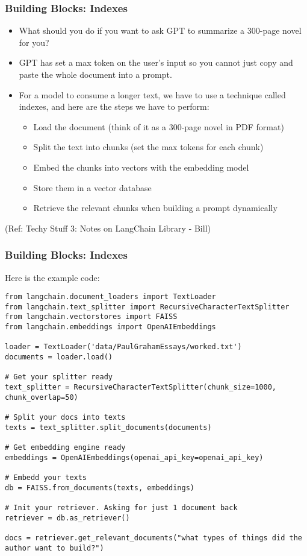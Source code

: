 \begin{frame}[fragile]\frametitle{Building Blocks: Indexes}

\begin{itemize}
\item What should you do if you want to ask GPT to summarize a 300-page novel for you? 
\item GPT has set a max token on the user’s input so you cannot just copy and paste the whole document into a prompt. 
\item For a model to consume a longer text, we have to use a technique called indexes, and here are the steps we have to perform:
\begin{itemize}
\item Load the document (think of it as a 300-page novel in PDF format)
\item Split the text into chunks (set the max tokens for each chunk)
\item Embed the chunks into vectors with the embedding model
\item Store them in a vector database
\item Retrieve the relevant chunks when building a prompt dynamically
\end{itemize}
\end{itemize}

{\tiny (Ref: Techy Stuff 3: Notes on LangChain Library - Bill)}

\end{frame}

\begin{frame}[fragile]\frametitle{Building Blocks: Indexes}

Here is the example code:


\begin{lstlisting}
from langchain.document_loaders import TextLoader
from langchain.text_splitter import RecursiveCharacterTextSplitter
from langchain.vectorstores import FAISS
from langchain.embeddings import OpenAIEmbeddings

loader = TextLoader('data/PaulGrahamEssays/worked.txt')
documents = loader.load()

# Get your splitter ready
text_splitter = RecursiveCharacterTextSplitter(chunk_size=1000, chunk_overlap=50)

# Split your docs into texts
texts = text_splitter.split_documents(documents)

# Get embedding engine ready
embeddings = OpenAIEmbeddings(openai_api_key=openai_api_key)

# Embedd your texts
db = FAISS.from_documents(texts, embeddings)

# Init your retriever. Asking for just 1 document back
retriever = db.as_retriever()

docs = retriever.get_relevant_documents("what types of things did the author want to build?")
\end{lstlisting}	  
\end{frame}



